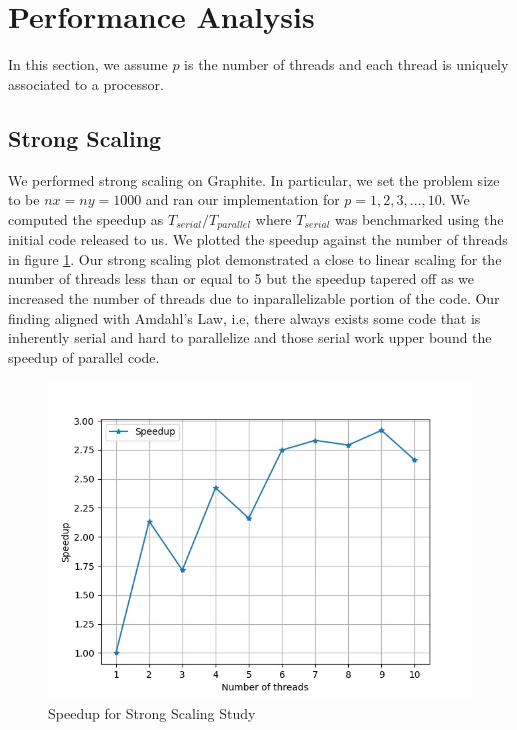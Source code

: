 \documentclass{article}
\begin{document}

\section{Performance Analysis}
In this section, we assume $p$ is the number of threads and each thread is uniquely associated to a processor.

\subsection{Strong Scaling}
\label{sec: strong_scaling}
We performed strong scaling on Graphite. In particular, we set the problem size to be $nx = ny = 1000$ and ran our implementation for $p = 1, 2, 3, \ldots, 10$. 
We computed the speedup as $T_{serial} / T_{parallel}$ where $T_{serial}$ was benchmarked using the initial code released to us. 
We plotted the speedup against the number of threads in figure \ref{fig:strong_scaling}. 
Our strong scaling plot demonstrated a close to linear scaling for the number of threads less than or equal to 5 but the speedup tapered off 
as we increased the number of threads due to inparallelizable portion of the code.
Our finding aligned with Amdahl’s Law, i.e, there always exists some code that is inherently serial and hard to parallelize and those serial work upper bound the speedup of parallel code.

\begin{figure}[h!]
	\centering
	\includegraphics[width=0.8\columnwidth]{../strong_scaling.jpg}
	\caption{Speedup for Strong Scaling Study}
	\label{fig:strong_scaling}
\end{figure}
\end{document}
